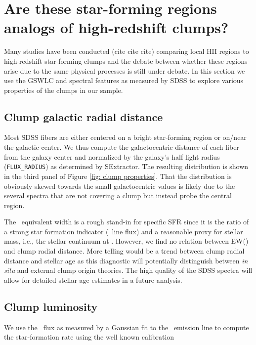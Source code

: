 


\section{Are these star-forming regions analogs of high-redshift clumps?}
Many studies have been conducted (cite cite cite) comparing local HII regions to high-redshift star-forming clumps and the debate between whether these regions arise due to the same physical processes is still under debate. In this section we use the GSWLC and spectral features as measured by SDSS to explore various properties of the clumps in our sample. 


\subsection{Clump galactic radial distance} \label{subsec:radii}

Most SDSS fibers are either centered on a bright star-forming region or on/near the galactic center. We thus compute the galactocentric distance of each fiber from the galaxy center and normalized by the galaxy's half light radius (\texttt{FLUX\_RADIUS}) as determined by SExtractor. The resulting distribution is shown in the third panel of Figure \ref{fig: clump properties}. That the distribution is obviously skewed towards the small galactocentric values is likely due to the several spectra that are not covering a clump but instead probe the central region.  

 The \ha~equivalent width is a rough stand-in for specific SFR since it is the ratio of a strong star formation indicator (\ha~line flux) and a reasonable proxy for stellar mass, i.e., the stellar continuum at \ha \citep{MarmolQueralto2016}. However, we find no relation between EW(\ha) and clump radial distance. More telling would be a trend between clump radial distance and stellar age as this diagnostic will potentially distinguish between \textit{in situ} and external clump origin theories. The high quality of the SDSS spectra will allow for detailed stellar age estimates in a future analysis.  

\subsection{Clump luminosity}
We use the \ha~flux as measured by a Gaussian fit to the \ha~emission line to compute the star-formation rate using the well known calibration \citep[e.g.,][and references therein]{Calzetti2013}

